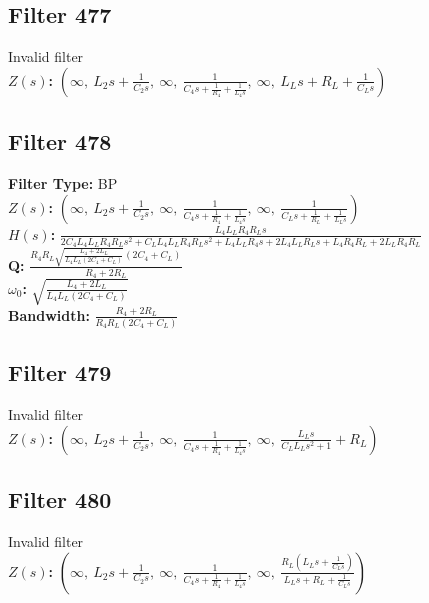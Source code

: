 \documentclass{article}
\begin{document}
\subsection*{Filter 477}
Invalid filter \\ 
\textbf{$Z(s)$:} $\left( \infty, \  L_{2} s + \frac{1}{C_{2} s}, \  \infty, \  \frac{1}{C_{4} s + \frac{1}{R_{4}} + \frac{1}{L_{4} s}}, \  \infty, \  L_{L} s + R_{L} + \frac{1}{C_{L} s}\right)$ \\ 
\subsection*{Filter 478}
\textbf{Filter Type:} BP \\ 
\textbf{$Z(s)$:} $\left( \infty, \  L_{2} s + \frac{1}{C_{2} s}, \  \infty, \  \frac{1}{C_{4} s + \frac{1}{R_{4}} + \frac{1}{L_{4} s}}, \  \infty, \  \frac{1}{C_{L} s + \frac{1}{R_{L}} + \frac{1}{L_{L} s}}\right)$ \\ 
\textbf{$H(s)$:} $\frac{L_{4} L_{L} R_{4} R_{L} s}{2 C_{4} L_{4} L_{L} R_{4} R_{L} s^{2} + C_{L} L_{4} L_{L} R_{4} R_{L} s^{2} + L_{4} L_{L} R_{4} s + 2 L_{4} L_{L} R_{L} s + L_{4} R_{4} R_{L} + 2 L_{L} R_{4} R_{L}}$ \\ 
\textbf{Q:} $\frac{R_{4} R_{L} \sqrt{\frac{L_{4} + 2 L_{L}}{L_{4} L_{L} \left(2 C_{4} + C_{L}\right)}} \left(2 C_{4} + C_{L}\right)}{R_{4} + 2 R_{L}}$ \\ 
\textbf{$\omega_0$:} $\sqrt{\frac{L_{4} + 2 L_{L}}{L_{4} L_{L} \left(2 C_{4} + C_{L}\right)}}$ \\ 
\textbf{Bandwidth:} $\frac{R_{4} + 2 R_{L}}{R_{4} R_{L} \left(2 C_{4} + C_{L}\right)}$ \\ 
\subsection*{Filter 479}
Invalid filter \\ 
\textbf{$Z(s)$:} $\left( \infty, \  L_{2} s + \frac{1}{C_{2} s}, \  \infty, \  \frac{1}{C_{4} s + \frac{1}{R_{4}} + \frac{1}{L_{4} s}}, \  \infty, \  \frac{L_{L} s}{C_{L} L_{L} s^{2} + 1} + R_{L}\right)$ \\ 
\subsection*{Filter 480}
Invalid filter \\ 
\textbf{$Z(s)$:} $\left( \infty, \  L_{2} s + \frac{1}{C_{2} s}, \  \infty, \  \frac{1}{C_{4} s + \frac{1}{R_{4}} + \frac{1}{L_{4} s}}, \  \infty, \  \frac{R_{L} \left(L_{L} s + \frac{1}{C_{L} s}\right)}{L_{L} s + R_{L} + \frac{1}{C_{L} s}}\right)$ \\ 
\end{document}
